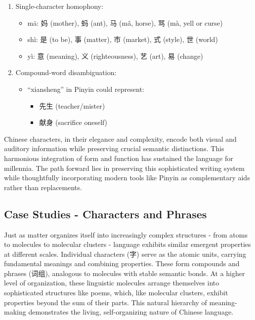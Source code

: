 \documentclass[11pt,letterpaper]{article}
\begin{document}
\begin{enumerate}
\def\labelenumi{\arabic{enumi}.}
\tightlist
\item
  Single-character homophony:

  \begin{itemize}
  \tightlist
  \item
    mā: 妈 (mother), 蚂 (ant), 马 (mǎ, horse), 骂 (mà, yell or curse)
  \item
    shì: 是 (to be), 事 (matter), 市 (market), 式 (style), 世 (world)
  \item
    yì: 意 (meaning), 义 (righteousness), 艺 (art), 易 (change)
  \end{itemize}
\item
  Compound-word disambiguation:

  \begin{itemize}
  \tightlist
  \item
    ``xiansheng'' in Pinyin could represent:

    \begin{itemize}
    \tightlist
    \item
      先生 (teacher/mister)
    \item
      献身 (sacrifice oneself)
    \end{itemize}
  \end{itemize}
\end{enumerate}

Chinese characters, in their elegance and complexity, encode both visual
and auditory information while preserving crucial semantic distinctions.
This harmonious integration of form and function has sustained the
language for millennia. The path forward lies in preserving this
sophisticated writing system while thoughtfully incorporating modern
tools like Pinyin as complementary aids rather than replacements.

\subsection{Case Studies - Characters and Phrases}\label{case-studies---characters-and-phrases}

Just as matter organizes itself into increasingly complex structures -
from atoms to molecules to molecular clusters - language exhibits
similar emergent properties at different scales. Individual characters
(字) serve as the atomic units, carrying fundamental meanings and
combining properties. These form compounds and phrases (词组), analogous
to molecules with stable semantic bonds. At a higher level of
organization, these linguistic molecules arrange themselves into
sophisticated structures like poems, which, like molecular clusters,
exhibit properties beyond the sum of their parts. This natural hierarchy
of meaning-making demonstrates the living, self-organizing nature of
Chinese language.
\end{document}
